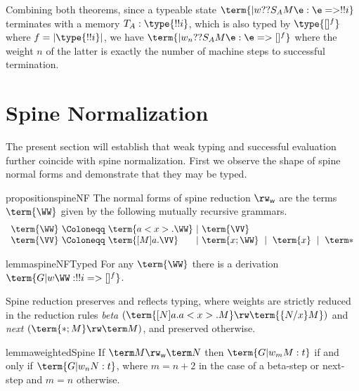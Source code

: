 \documentclass[a4paper,UKenglish,cleveref, autoref, thm-restate]{lipics-v2021}
\newcommand\spine{\mathsf w}
\begin{document}
Combining both theorems, since a typeable state $\term{|w ??{S_A}M\e: \e=>!!i}$ terminates with a memory $T_A:\type{!!i}$, which is also typed by $\type{[]^f}$ where $f=|\type{!!i}|$, we have $\term{|w_n ??{S_A}M\e: \e =>[]^f}$ where the weight $n$ of the latter is exactly the number of machine steps to successful termination.


\section{Spine Normalization}
\label{sec:spine}

The present section will establish that weak typing and successful evaluation further coincide with spine normalization. First we observe the shape of spine normal forms and demonstrate that they may be typed.


\begin{restatable}{proposition}{spineNF}
\label{prop:spine NF}
The normal forms of spine reduction $\rw_\spine$ are the terms $\term{\WW}$ given by the following mutually recursive grammars.
\[
\begin{array}{l@{~}l@{~}l@{~}l@{~}l}
	\term{\WW} &\Coloneqq& \term{a<x>.\WW} &\mid& \term{\VV}
\\	\term{\VV} &\Coloneqq& \term{[M]a.\VV} &\mid& \term{x;\WW} ~\mid~ \term{x}  ~\mid~ \term*
\end{array}
\]
\end{restatable}


\begin{restatable}{lemma}{spineNFTyped}
\label{lem:spine NF => typed}
For any $\term{\WW}$ there is a derivation $\term{G |w \WW : !!i => []^f}$.
\end{restatable}


Spine reduction preserves and reflects typing, where weights are strictly reduced in the reduction rules \emph{beta} $(\term{[N]a.a<x>.M}\rw\term{\{N/x\}M})$ and \emph{next} $(\term{*;M}\rw\term M)$, and preserved otherwise.


\begin{restatable}{lemma}{weightedSpine}
\label{lem:spine reduction}
If $\term M\rw_\spine\term N$ then $\term{G |w_m M:t}$ if and only if $\term{G |w_n N:t}$, where $m=n+2$ in the case of a beta-step or next-step and $m=n$ otherwise.
\end{restatable}
\end{document}
